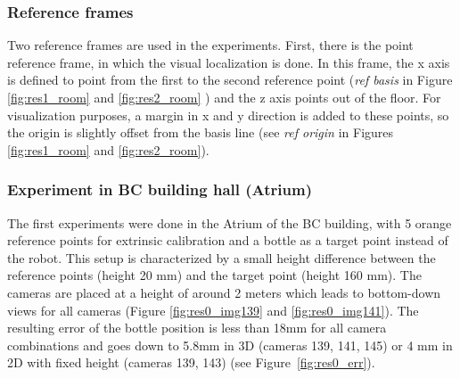 \subsubsection{Reference frames}
Two reference frames are used in the experiments. First, there is the point reference frame, in which the visual localization is done. 
In this frame, the x axis is defined to point from the first to the second reference point (\textit{ref basis} in Figure \ref{fig:res1_room} and \ref{fig:res2_room} ) and the z axis points out of the floor.
For visualization purposes, a margin in x and y direction is added to these points, so the origin is slightly offset from the basis line (see \textit{ref origin} in Figures \ref{fig:res1_room} and \ref{fig:res2_room}).

\subsubsection{Experiment in BC building hall (Atrium)}
The first experiments were done in the Atrium of the BC building, with 5 orange reference points for extrinsic calibration and a bottle as a target point instead of the robot.
This setup is characterized by a small height difference between the reference points (height 20 mm) and the target point (height 160 mm). 
The cameras are placed at a height of around 2 meters which leads to bottom-down views for all cameras (Figure \ref{fig:res0_img139} and \ref{fig:res0_img141}).
The resulting error of the bottle position is less than 18mm for all camera combinations and goes down to 5.8mm in 3D (cameras 139, 141, 145) or 4 mm in 2D with fixed height (cameras 139, 143) (see Figure~\ref{fig:res0_err}). 

